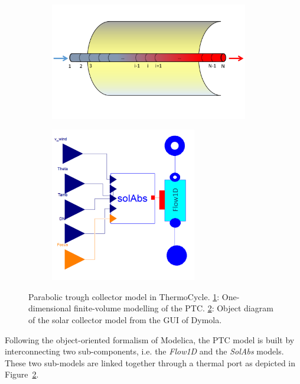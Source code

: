 \documentclass[final,3p,times,review]{elsarticle}
\begin{document}
\begin{figure}[h]
	\centering
	\begin{subfigure}[b]{0.48\textwidth}
		\centering
		\includegraphics[width=0.95\textwidth]{Figures/PTC_FV.pdf}
		\caption{}
		\label{fig:PTC_FV}	
	\end{subfigure}
	\begin{subfigure}[b]{0.48\textwidth}
		\centering
		\includegraphics[width=0.7\textwidth]{Figures/PTC_GUI}
		\caption{}
		\label{fig:PTC_GUI}
	\end{subfigure}
	\caption{Parabolic trough collector model in ThermoCycle. \ref{fig:PTC_FV}: One-dimensional finite-volume modelling of the PTC. \ref{fig:PTC_GUI}: Object diagram of the solar collector model from the GUI of Dymola.}
	\label{fig:PTC_model}
\end{figure}
%
Following the object-oriented formalism of Modelica, the PTC model is built by interconnecting two sub-components, i.e. the \textit{Flow1D} and the \textit{SolAbs} models. These two sub-models are linked together through a thermal port as depicted in Figure~\ref{fig:PTC_GUI}.\\
\end{document}
